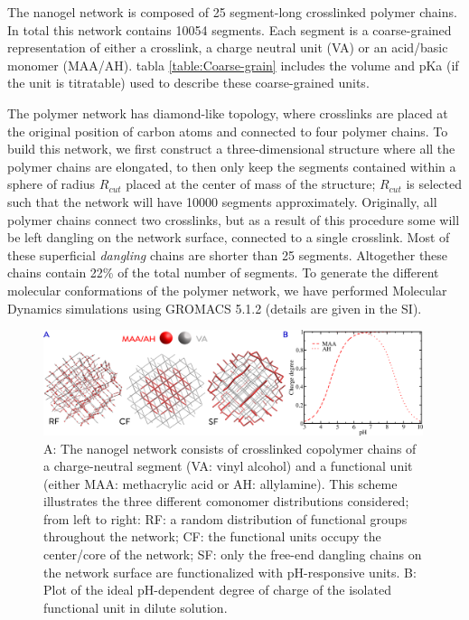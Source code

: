The nanogel network is composed of 25 segment-long  crosslinked polymer chains. 
In total this network contains 10054 segments.
Each segment is a coarse-grained   representation of either a crosslink, a charge neutral unit (VA) or an acid/basic monomer (MAA/AH). 
tabla \ref{table:Coarse-grain} includes the volume and pKa (if the unit is titratable) used to describe these coarse-grained units.

The polymer network has diamond-like topology, where  crosslinks are placed at the original position of carbon atoms and connected to four polymer chains.
To build this network, we first construct a three-dimensional structure where all the polymer chains are elongated, to then only keep the segments contained within a sphere of radius $R_{cut}$ placed at the center of mass of the structure; $R_{cut}$ is selected such that the network will have 10000 segments approximately.
Originally, all polymer chains connect two crosslinks, but as a result of this procedure some will be left dangling on the network surface,  connected to a single crosslink.
Most of these superficial \emph{dangling} chains are shorter than 25 segments.
Altogether these chains contain 22\% of the total number of segments.
To generate the different molecular conformations of the polymer network, we have performed Molecular Dynamics simulations using GROMACS 5.1.2  (details are given in the SI).

 \begin{figure}[!htb]
     \centering
     \includegraphics[width=0.99\textwidth]{Figures/graphs-gel2/paper2.png}
     \caption{A: The nanogel network consists of crosslinked copolymer chains of a charge-neutral segment (VA: vinyl alcohol) and a functional unit (either MAA: methacrylic acid or AH: allylamine).
    This scheme illustrates the three different comonomer distributions considered;  from left to right: RF: a random distribution of functional groups throughout the network; CF: the functional units occupy the center/core of the network; SF: only the free-end dangling chains on the network surface are functionalized with pH-responsive units.
B: Plot of the ideal pH-dependent degree of charge of the isolated functional unit in dilute solution.}
     \label{fig:gel-topologies}
 \end{figure}














